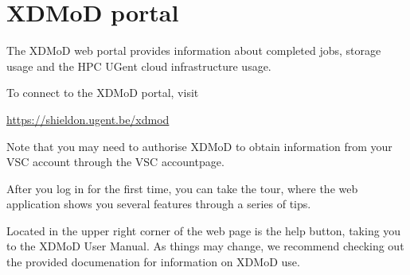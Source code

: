 \chapter{XDMoD portal}
\label{ch:xdmod}

The XDMoD web portal provides information about completed jobs, storage usage and
the HPC UGent cloud infrastructure usage.

To connect to the XDMoD portal, visit

\begin{center}\url{https://shieldon.ugent.be/xdmod}\end{center}

Note that you may need to authorise XDMoD to obtain information from your VSC
account through the VSC accountpage.

After you log in for the first time, you can take the tour, where the web
application shows you several features through a series of tips.

Located in the upper right corner of the web page is the help button, taking
you to the XDMoD User Manual. As things may change, we recommend checking out
the provided documenation for information on XDMoD use.

